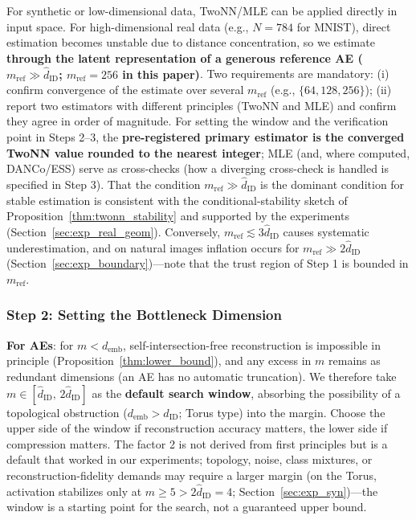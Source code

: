 \documentclass[make,article,submit,pdftex,moreauthors]{Definitions/mdpi}
\newcommand{\dID}{d_{\mathrm{ID}}}
\newcommand{\hatdID}{\hat{d}_{\mathrm{ID}}}
\newcommand{\demb}{d_{\mathrm{emb}}}
\begin{document}
For synthetic or low-dimensional data, TwoNN/MLE can be applied directly in
input space.
For high-dimensional real data (e.g., $N = 784$ for MNIST), direct
estimation becomes unstable due to distance concentration, so we estimate
\textbf{through the latent representation of a generous reference AE
($m_{\mathrm{ref}} \gg \hatdID$; $m_{\mathrm{ref}} = 256$ in this paper)}.
Two requirements are mandatory:
(i) confirm convergence of the estimate over several $m_{\mathrm{ref}}$
(e.g., $\{64, 128, 256\}$);
(ii) report two estimators with different principles (TwoNN and MLE) and
confirm they agree in order of magnitude.
For setting the window and the verification point in Steps 2--3, the
\textbf{pre-registered primary estimator is the converged TwoNN value
rounded to the nearest integer}; MLE (and, where computed, DANCo/ESS)
serve as cross-checks (how a diverging cross-check is handled is specified
in Step 3).
That the condition $m_{\mathrm{ref}} \gg \hatdID$ is the dominant condition
for stable estimation is consistent with the conditional-stability sketch
of Proposition~\ref{thm:twonn_stability} and supported by the experiments
(Section~\ref{sec:exp_real_geom}).
Conversely, $m_{\mathrm{ref}} \lesssim 3\hatdID$ causes systematic
underestimation, and on natural images inflation occurs for
$m_{\mathrm{ref}} \gg 2\hatdID$ (Section~\ref{sec:exp_boundary})---note that
the trust region of Step 1 is bounded in $m_{\mathrm{ref}}$.

\subsubsection{Step 2: Setting the Bottleneck Dimension}\label{sec:protocol_s2}

\textbf{For AEs}: for $m < \demb$, self-intersection-free reconstruction is
impossible in principle (Proposition~\ref{thm:lower_bound}), and any excess
in $m$ remains as redundant dimensions (an AE has no automatic truncation).
We therefore take $m \in [\hatdID,\, 2\hatdID]$ as the \textbf{default
search window}, absorbing the possibility of a topological obstruction
($\demb > \dID$; Torus type) into the margin.
Choose the upper side of the window if reconstruction accuracy matters, the
lower side if compression matters.
The factor 2 is not derived from first principles but is a default that
worked in our experiments; topology, noise, class mixtures, or
reconstruction-fidelity demands may require a larger margin (on the Torus,
activation stabilizes only at $m \geq 5 > 2\hatdID = 4$;
Section~\ref{sec:exp_syn})---the window is a starting point for the search,
not a guaranteed upper bound.
\end{document}

